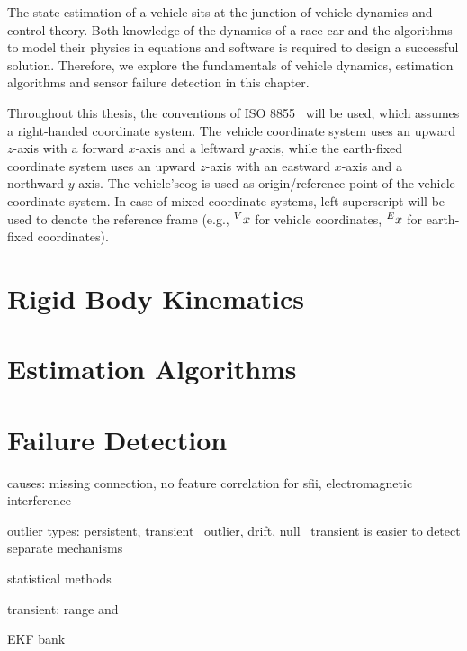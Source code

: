 The state estimation of a vehicle sits at the junction of vehicle dynamics and control theory. Both knowledge of the dynamics of a race car and the algorithms to model their physics in equations and software is required to design a successful solution. Therefore, we explore the fundamentals of vehicle dynamics, estimation algorithms and sensor failure detection in this chapter.

Throughout this thesis, the conventions of ISO 8855~\cite{ISO.2011} will be used, which assumes a right-handed coordinate system. The vehicle coordinate system uses an upward $z$-axis with a forward $x$-axis and a leftward $y$-axis, while the earth-fixed coordinate system uses an upward $z$-axis with an eastward $x$-axis and a northward $y$-axis. The vehicle's\gls{cog} is used as origin/reference point of the vehicle coordinate system. In case of mixed coordinate systems, left-superscript will be used to denote the reference frame (e.g., $\prescript{V}{}{x}$ for vehicle coordinates, $\prescript{E}{}{x}$ for earth-fixed coordinates).


\section{Rigid Body Kinematics}



\section{Estimation Algorithms}



\section{Failure Detection}
causes: missing connection, no feature correlation for sfii, electromagnetic interference

outlier types: persistent, transient~\cite[p.~170~ff.]{Himmelblau.1994}
outlier, drift, null~\cite[p.~19 f.]{Kabzan.13.05.2019}
transient is easier to detect
separate mechanisms

statistical methods

transient: range and

EKF bank
